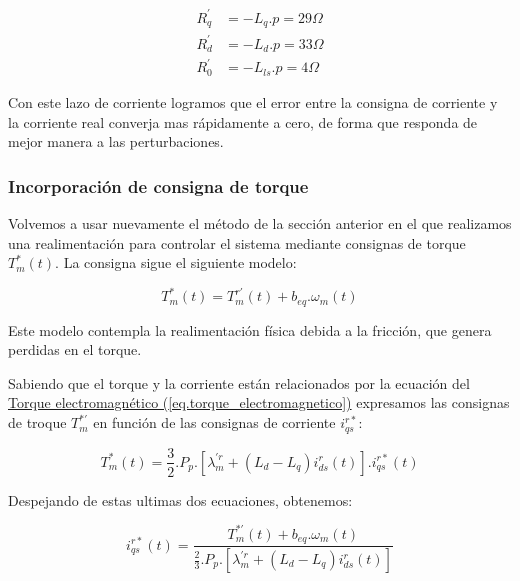 \documentclass{article}
\begin{document}
\begin{align*}
    R_q^\prime &= -L_q.p = 29\varOmega  \\
    R_d^\prime &= -L_d.p = 33\varOmega \\
    R_0^\prime &= -L_{ls}.p = 4\varOmega
\end{align*}

Con este lazo de corriente logramos que el error entre la consigna de corriente y la corriente real
converja mas rápidamente a cero, de forma que responda de mejor manera a las perturbaciones.




\subsubsection*{Incorporación de consigna de torque}

Volvemos a usar nuevamente el método de la sección anterior en el que realizamos una realimentación
para controlar el sistema mediante consignas de torque $T_m^*(t)$. La consigna sigue el siguiente modelo:

\begin{equation}
    T_m^*(t) = T_m^{r\prime}(t) + b_{eq}.\omega_m(t)
\end{equation}

Este modelo contempla la realimentación física debida a la fricción, que genera perdidas en el torque.

Sabiendo que el torque y la corriente están relacionados por la ecuación del
\hyperref[eq.torque_electromagnetico]{Torque electromagnético (\ref*{eq.torque_electromagnetico})}
expresamos las consignas de troque $T_m^{*\prime}$ en función de las consignas de corriente $i_{qs}^{r*}$:

\begin{equation}
    T_m^{*}(t) = \frac{3}{2}.P_p.[\lambda_m^{\prime r} + (L_d - L_q)i_{ds}^{r}(t)].i_{qs}^{r*}(t)
\end{equation}

Despejando de estas ultimas dos ecuaciones, obtenemos:

\begin{equation}
    i_{qs}^{r*}(t) = \frac{T_m^{*\prime}(t) + b_{eq}.\omega_m(t)}{\frac{2}{3}.P_p.[\lambda_m^{\prime r} + (L_d - L_q)i_{ds}^{r}(t)]}
\end{equation}
\end{document}
